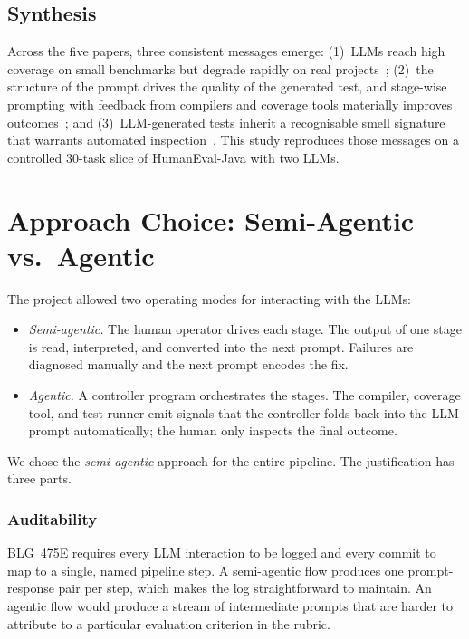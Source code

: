 \documentclass[journal]{IEEEtran}
\begin{document}
\subsection{Synthesis}
Across the five papers, three consistent messages emerge:
(1)~LLMs reach high coverage on small benchmarks but degrade
rapidly on real
projects~\cite{siddiq2024junit,liu2023evalplus};
(2)~the structure of the prompt drives the quality of the
generated test, and stage-wise prompting with feedback from
compilers and coverage tools materially improves
outcomes~\cite{yuan2024chattester,wang2024hits,yang2024telpa};
and (3)~LLM-generated tests inherit a recognisable smell
signature that warrants automated
inspection~\cite{grano2024testsmells}. This study reproduces
those messages on a controlled 30-task slice of HumanEval-Java
with two LLMs.

\section{Approach Choice: Semi-Agentic vs.\ Agentic}
\label{sec:approach}
The project allowed two operating modes for interacting with
the LLMs:
\begin{itemize}
    \item \emph{Semi-agentic.} The human operator drives each
    stage. The output of one stage is read, interpreted, and
    converted into the next prompt. Failures are diagnosed
    manually and the next prompt encodes the fix.
    \item \emph{Agentic.} A controller program orchestrates
    the stages. The compiler, coverage tool, and test runner
    emit signals that the controller folds back into the LLM
    prompt automatically; the human only inspects the final
    outcome.
\end{itemize}

We chose the \emph{semi-agentic} approach for the entire
pipeline. The justification has three parts.

\subsubsection*{Auditability}
BLG~475E requires every LLM interaction to be logged and every
commit to map to a single, named pipeline step. A semi-agentic
flow produces one prompt-response pair per step, which makes
the log straightforward to maintain. An agentic flow would
produce a stream of intermediate prompts that are harder to
attribute to a particular evaluation criterion in the rubric.
\end{document}
